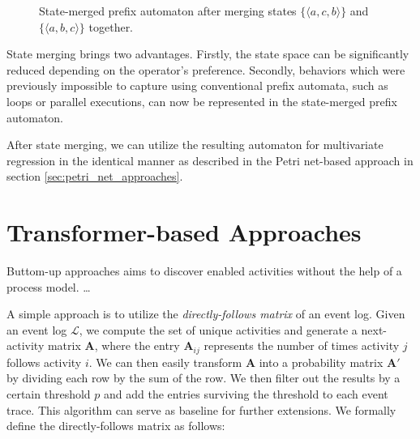 \begin{figure}[H]
    \centering
    \caption{State-merged prefix automaton after merging states $\{ \langle a, c, b \rangle \}$ and $\{ \langle a, b, c \rangle \}$ together.}
    \label{fig:state_merged_prefix_automaton_1}
\end{figure}

State merging brings two advantages. Firstly, the state space can be significantly reduced depending on the operator's preference. Secondly, behaviors which were previously impossible to capture using conventional prefix automata, such as loops or parallel executions, can now be represented in the state-merged prefix automaton.

After state merging, we can utilize the resulting automaton for multivariate regression in the identical manner as described in the Petri net-based approach in section \ref{sec:petri_net_approaches}.

\section{Transformer-based Approaches}

Buttom-up approaches aims to discover enabled activities without the help of a process model. \dots

A simple approach is to utilize the \emph{directly-follows matrix} of an event log.
Given an event log $\mathcal{L}$, we compute the set of unique activities and generate a next-activity matrix $\mathbf{A}$, where the entry $\mathbf{A}_{ij}$ represents the number of times activity $j$ follows activity $i$. We can then easily transform $\mathbf{A}$ into a probability matrix $\mathbf{A'}$ by dividing each row by the sum of the row. We then filter out the results by a certain threshold $p$ and add the entries surviving the threshold to each event trace. This algorithm can serve as baseline for further extensions. We formally define the directly-follows matrix as follows:

